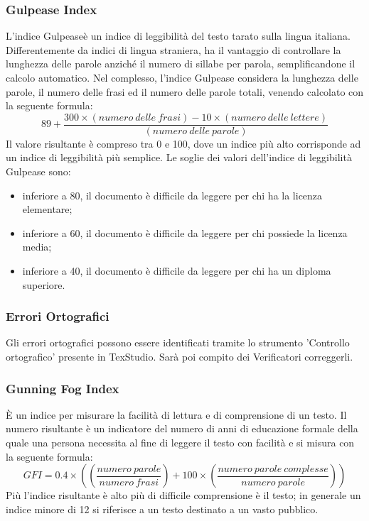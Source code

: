 		\subsubsection{Gulpease Index} 
		\label{C.2.1}
		L’indice Gulpease\pedice è un indice di leggibilità del testo tarato sulla
		lingua italiana. Differentemente da indici di lingua straniera, ha il vantaggio di controllare
la lunghezza delle parole anziché il numero di sillabe per parola, semplificandone il calcolo
automatico.
		Nel complesso, l’indice Gulpease considera la lunghezza delle parole, il numero delle frasi
ed il numero delle parole totali, venendo calcolato con la seguente formula:\newline
		\[
		 	89+\frac{300 \times (numero ~delle ~frasi) - 10 \times (numero ~delle ~lettere)}{(numero ~delle ~parole)}
		\]\newline	
		Il valore risultante è compreso tra 0 e 100, dove un indice più alto corrisponde ad un
indice di leggibilità più semplice.
		Le soglie dei valori dell’indice di leggibilità Gulpease sono:
		\begin{itemize}
			\item inferiore a 80, il documento è difficile da leggere per chi ha la licenza elementare;
			\item  inferiore a 60, il documento è difficile da leggere per chi possiede la licenza media;
			\item inferiore a 40, il documento è difficile da leggere per chi ha un diploma superiore.
			\newline
		\end{itemize}
		\subsubsection{Errori Ortografici} \label{C.2.2} Gli errori ortografici possono essere identificati tramite lo strumento 'Controllo ortografico' presente in TexStudio. Sarà poi compito dei Verificatori correggerli.
\newline
		\subsubsection{Gunning Fog Index} È un indice per misurare la facilità di lettura e di comprensione di un testo. Il numero risultante è un indicatore del numero di anni di educazione formale della quale una persona necessita al fine di leggere il testo con facilità e si misura con la seguente formula:\newline
		\[
		GFI=0.4\times((\frac{numero ~parole}{numero ~frasi})+100\times(\frac{numero ~parole ~complesse}{numero ~parole}))
		\]\newline
		Più l'indice risultante è alto più di difficile comprensione è il testo; in generale un indice minore di 12 si riferisce a un testo destinato a un vasto pubblico.
